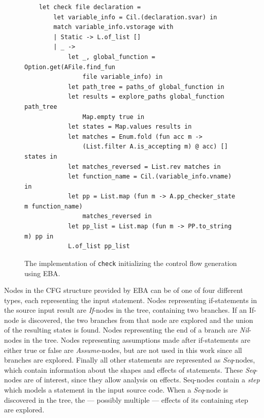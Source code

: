 \begin{figure}[H]
    \centering
    \begin{verbatim}
    let check file declaration =
        let variable_info = Cil.(declaration.svar) in
        match variable_info.vstorage with 
        | Static -> L.of_list []
        | _ ->
            let _, global_function = Option.get(AFile.find_fun 
                file variable_info) in
            let path_tree = paths_of global_function in
            let results = explore_paths global_function path_tree 
                Map.empty true in 
            let states = Map.values results in
            let matches = Enum.fold (fun acc m -> 
                (List.filter A.is_accepting m) @ acc) [] states in
            let matches_reversed = List.rev matches in 
            let function_name = Cil.(variable_info.vname) in 
            let pp = List.map (fun m -> A.pp_checker_state m function_name) 
                matches_reversed in
            let pp_list = List.map (fun m -> PP.to_string m) pp in
            L.of_list pp_list
    \end{verbatim}
    \caption{The implementation of \texttt{check} initializing the control flow generation using EBA.}
    \label{check-implementation}
\end{figure}

\newpar Nodes in the CFG structure provided by EBA can be of one of four different types, each representing the input statement. Nodes representing if-statements in the source input result are \textit{If}-nodes in the tree, containing two branches. If an If-node is discovered, the two branches from that node are explored and the union of the resulting states is found. Nodes representing the end of a branch are \textit{Nil}-nodes in the tree. Nodes representing assumptions made after if-statements are either true or false are \textit{Assume}-nodes, but are not used in this work since all branches are explored. Finally all other statements are represented as \textit{Seq}-nodes, which contain information about the shapes and effects of statements. These \textit{Seq}-nodes are of interest, since they allow analysis on effects. Seq-nodes contain a \textit{step} which models a statement in the input source code. When a \textit{Seq}-node is discovered in the tree, the --- possibly multiple --- effects of its containing step are explored. 


